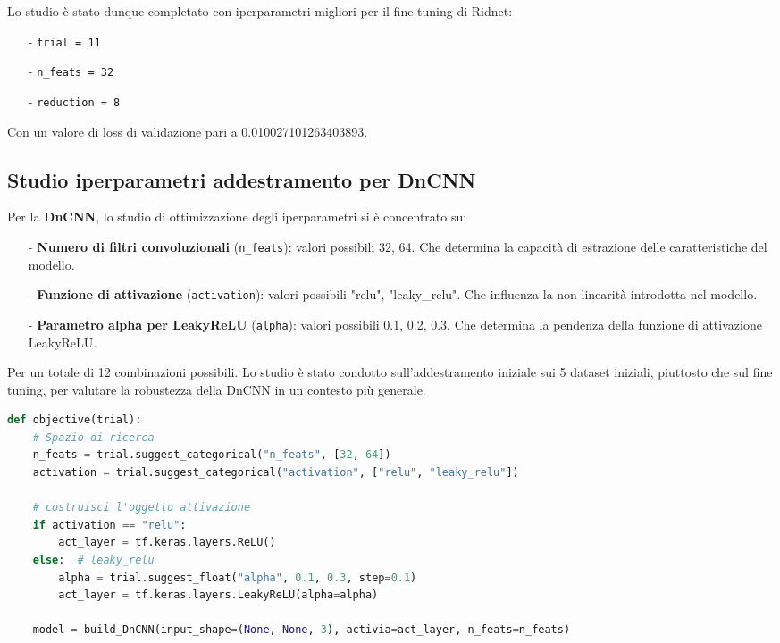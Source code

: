 \documentclass[12pt,a4paper,openright,twoside]{book}
\begin{document}
Lo studio è stato dunque completato con iperparametri migliori per il fine tuning di Ridnet:
\begin{itemize}
    \label{itm:best_ridnet_params}
    \item[-] \texttt{trial = 11}
    \item[-] \texttt{n\_feats = 32}
    \item[-] \texttt{reduction = 8}
\end{itemize}
Con un valore di loss di validazione pari a 0.010027101263403893.

\subsection*{Studio iperparametri addestramento per DnCNN}
Per la \textbf{DnCNN}, lo studio di ottimizzazione degli iperparametri si è concentrato su: 
\begin{itemize}
    \item [-] \textbf{Numero di filtri convoluzionali} (\texttt{n\_feats}): valori possibili 32, 64. Che determina la capacità di estrazione delle caratteristiche del modello.
    \item [-] \textbf{Funzione di attivazione} (\texttt{activation}): valori possibili "relu", "leaky\_relu". Che influenza la non linearità introdotta nel modello.
    \item [-] \textbf{Parametro alpha per LeakyReLU} (\texttt{alpha}): valori possibili 0.1, 0.2, 0.3. Che determina la pendenza della funzione di attivazione LeakyReLU.
\end{itemize}
Per un totale di 12 combinazioni possibili.
Lo studio è stato condotto sull'addestramento iniziale sui 5 dataset iniziali, piuttosto che sul fine tuning, per valutare la robustezza della DnCNN in un contesto più generale.
\newpage
\begin{lstlisting}[language=Python, caption={Definizione della funzione obiettivo per DnCNN}, label={lst:dncnn_optuna_obj}]
def objective(trial):
    # Spazio di ricerca
    n_feats = trial.suggest_categorical("n_feats", [32, 64])
    activation = trial.suggest_categorical("activation", ["relu", "leaky_relu"])

    # costruisci l'oggetto attivazione
    if activation == "relu":
        act_layer = tf.keras.layers.ReLU()
    else:  # leaky_relu
        alpha = trial.suggest_float("alpha", 0.1, 0.3, step=0.1)
        act_layer = tf.keras.layers.LeakyReLU(alpha=alpha)

    model = build_DnCNN(input_shape=(None, None, 3), activia=act_layer, n_feats=n_feats)
\end{lstlisting}
\end{document}
